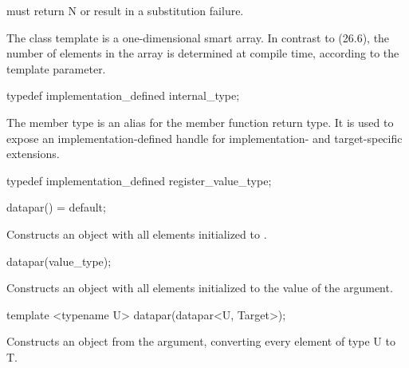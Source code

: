 \begin{wgText}
\begin{itemdescr}
    \pnum
     must return \code N or result in a substitution failure.
  \end{itemdescr}

  

  The class template \datapar{} is a one-dimensional smart array.
  In contrast to  (26.6), the number of elements in the array is determined at compile time, according to the  template parameter.

  \begin{itemdecl}
    typedef implementation_defined internal_type;
  \end{itemdecl}
  \begin{itemdescr}
    \pnum
    The  member type is an alias for the  member function return type.
    It is used to expose an implementation-defined handle for implementation- and target-specific extensions.
  \end{itemdescr}

  \begin{itemdecl}
    typedef implementation_defined register_value_type;
  \end{itemdecl}
  \begin{itemdescr}
  \end{itemdescr}

  \begin{itemdecl}
    datapar() = default;
  \end{itemdecl}
  \begin{itemdescr}
    \pnum
    \effects
    Constructs an object with all elements initialized to .
  \end{itemdescr}

  \begin{itemdecl}
    datapar(value_type);
  \end{itemdecl}
  \begin{itemdescr}
    \pnum
    \effects
    Constructs an object with all elements initialized to the value of the argument.
  \end{itemdescr}

  \begin{itemdecl}
    template <typename U> datapar(datapar<U, Target>);
  \end{itemdecl}
  \begin{itemdescr}
    \pnum
    \effects
    Constructs an object from the argument, converting every element of type \type U to \type T.
  \end{itemdescr}


\end{wgText}
